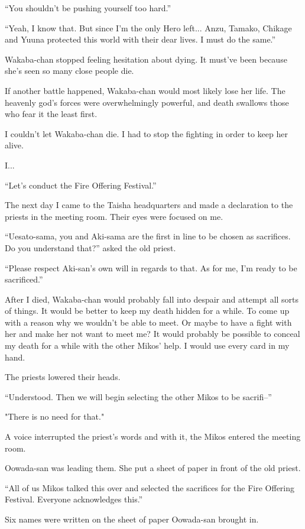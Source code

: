 ``You shouldn't be pushing yourself too hard.''

``Yeah, I know that. But since I'm the only Hero left... Anzu, Tamako, Chikage and Yuuna protected this world with their dear lives. I must do the same.''

Wakaba-chan stopped feeling hesitation about dying. It must've been because she's seen so many close people die.

If another battle happened, Wakaba-chan would most likely lose her life. The heavenly god's forces were overwhelmingly powerful, and death swallows those who fear it the least first.

I couldn't let Wakaba-chan die. I had to stop the fighting in order to keep her alive.

I...


``Let's conduct the Fire Offering Festival.''

The next day I came to the Taisha headquarters and made a declaration to the priests in the meeting room. Their eyes were focused on me.

``Uesato-sama, you and Aki-sama are the first in line to be chosen as sacrifices. Do you understand that?'' asked the old priest.

``Please respect Aki-san's own will in regards to that. As for me, I'm ready to be sacrificed.''

After I died, Wakaba-chan would probably fall into despair and attempt all sorts of things. It would be better to keep my death hidden for a while. To come up with a reason why we wouldn't be able to meet. Or maybe to have a fight with her and make her not want to meet me? It would probably be possible to conceal my death for a while with the other Mikos' help. I would use every card in my hand.

The priests lowered their heads.

``Understood. Then we will begin selecting the other Mikos to be sacrifi--''

"There is no need for that."

A voice interrupted the priest's words and with it, the Mikos entered the meeting room.

Oowada-san was leading them. She put a sheet of paper in front of the old priest.

``All of us Mikos talked this over and selected the sacrifices for the Fire Offering Festival. Everyone acknowledges this.''

Six names were written on the sheet of paper Oowada-san brought in.

